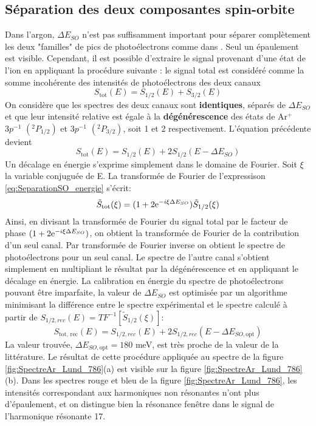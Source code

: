 \subsection{Séparation des deux composantes spin-orbite}
\label{subsec:SeparationSO}
Dans l'argon, $\Delta E_{SO}$ n'est pas suffisamment important pour séparer complètement les deux "familles" de pics de photoélectrons comme dans . Seul un épaulement est visible. Cependant, il est possible d'extraire le signal provenant d'une état de l'ion en appliquant la procédure suivante : le signal total est considéré comme la somme incohérente des intensités de photoélectrons des deux canaux
\begin{equation}
S_{\text{tot}} (E) = S_{1/2}(E) + S_{3/2}(E)
\end{equation} 
On considère que les spectres des deux canaux sont \textbf{identiques}, séparés de $\Delta E_{SO}$ et que leur intensité relative est égale à la \textbf{dégénérescence} des états de Ar$^+$ $3p^{-1}$ $(^{2}P_{1/2})$ et $3p^{-1}$ $(^{2}P_{3/2})$, soit 1 et 2 respectivement. L'équation précédente devient
\begin{equation}
S_{\text{tot}} (E) = S_{1/2}(E) + 2 S_{1/2}(E - \Delta E_{SO})
\label{eq:SeparationSO_energie}
\end{equation}
Un décalage en énergie s'exprime simplement dans le domaine de Fourier. Soit $\xi$ la variable conjuguée de E. La transformée de Fourier de l'expressison \ref{eq:SeparationSO_energie} s'écrit:
\begin{equation}
\tilde{S}_{\text{tot}}(\xi) = (1 + 2 \mathrm{e}^{-i\xi \Delta E_{SO}} ) \tilde{S}_{1/2}(\xi)
\end{equation}
Ainsi, en divisant la transformée de Fourier du signal total par le facteur de phase $(1 + 2 \mathrm{e}^{-i\xi \Delta E_{SO}})$, on obtient la transformée de Fourier de la contribution d'un seul canal. Par transformée de Fourier inverse on obtient le spectre de photoélectrons pour un seul canal. Le spectre de l'autre canal s'obtient simplement en multipliant le résultat par la dégénérescence et en appliquant le décalage en énergie. La calibration en énergie du spectre de photoélectrons pouvant être imparfaite, la valeur de $\Delta E_{SO}$ est optimisée par un algorithme minimisant la différence entre le spectre expérimental et le spectre calculé à partir de $S_{1/2, rec}(E) = TF^{-1}[\tilde{S}_{1/2}(\xi)]$:
\begin{equation}
S_{\text{tot, rec}} (E) = S_{1/2, rec}(E) + 2 S_{1/2, rec}(E - \Delta E_{SO,\text{opt}})
\label{eq:Rabbit_reconstruit}
\end{equation}
La valeur trouvée, $\Delta E_{SO,\text{opt}} = 180$ meV, est très proche de la valeur de la littérature. Le résultat de cette procédure appliquée au spectre de la figure \ref{fig:SpectreAr_Lund_786}(a) est visible sur la figure \ref{fig:SpectreAr_Lund_786}(b). Dans les spectres rouge et bleu de la figure \ref{fig:SpectreAr_Lund_786}, les intensités correspondant aux harmoniques non résonantes n'ont plus d'épaulement, et on distingue bien la résonance fenêtre dans le signal de l'harmonique résonante 17.

